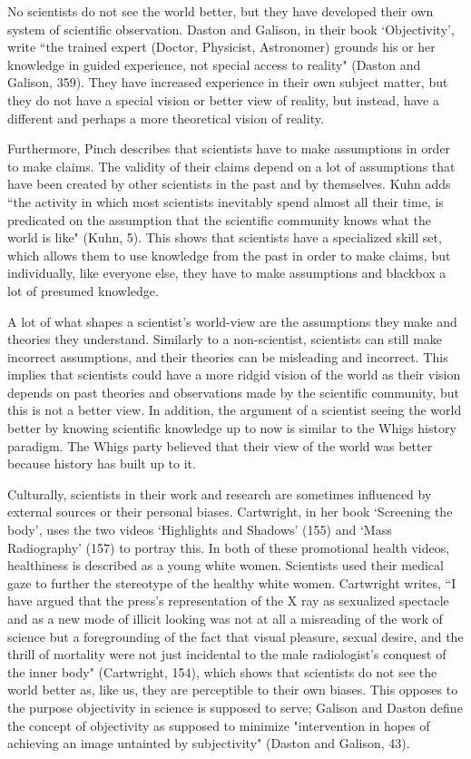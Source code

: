 \documentclass[11pt, oneside]{article}
\begin{document}
\par No scientists do not see the world better, but they have developed their own system of scientific observation. Daston and Galison, in their book `Objectivity', write ``the trained expert (Doctor, Physicist, Astronomer) grounds his or her knowledge in guided experience, not special access to reality" (Daston and Galison, 359). They have increased experience in their own subject matter, but they do not have a special vision or better view of reality, but instead, have a different and perhaps a more theoretical vision of reality.
\par Furthermore, Pinch describes that scientists have to make assumptions in order to make claims. The validity of their claims depend on a lot of assumptions that have been created by other scientists in the past and by themselves. Kuhn adds ``the activity in which most scientists inevitably spend almost all their time, is predicated on the assumption that the scientific community knows what the world is like" (Kuhn, 5). This shows that scientists have a specialized skill set, which allows them to use knowledge from the past in order to make claims, but individually, like everyone else, they have to make assumptions and blackbox a lot of presumed knowledge. 
\par A lot of what shapes a scientist's world-view are the assumptions they make and theories they understand. Similarly to a non-scientist, scientists can still make incorrect assumptions, and their theories can be misleading and incorrect. This implies that scientists could have a more ridgid vision of the world as their vision depends on past theories and observations made by the scientific community, but this is not a better view. In addition, the argument of a scientist seeing the world better by knowing scientific knowledge up to now is similar to the Whigs history paradigm. The Whigs party believed that their view of the world was better because history has built up to it. 
\par Culturally, scientists in their work and research are sometimes influenced by external sources or their personal biases. Cartwright, in her book `Screening the body', uses the two videos `Highlights and Shadows' (155) and `Mass Radiography' (157) to portray this. In both of these promotional health videos, healthiness is described as a young white women. Scientists used their medical gaze to further the stereotype of the healthy white women. Cartwright writes, ``I have argued that the press's representation of the X ray as sexualized spectacle and as a new mode of illicit looking was not at all a misreading of the work of science but a foregrounding of the fact that visual pleasure, sexual desire, and the thrill of mortality were not just incidental to the male radiologist's conquest of the inner body" (Cartwright, 154), which shows that scientists do not see the world better as, like us, they are perceptible to their own biases. This opposes to the purpose objectivity in science is supposed to serve; Galison and Daston define the concept of objectivity as supposed to minimize "intervention in hopes of achieving an image untainted by subjectivity" (Daston and Galison, 43). 
\end{document}
